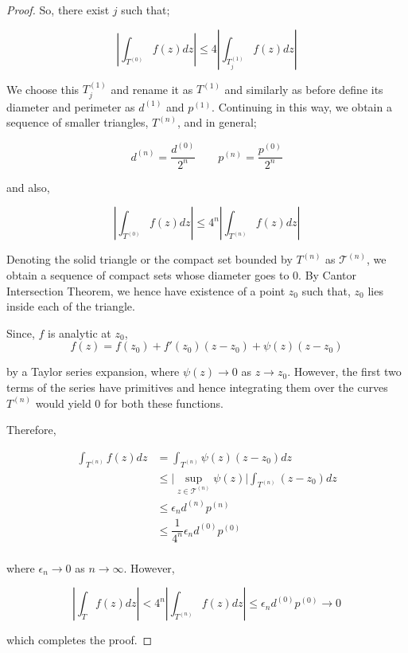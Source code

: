 \documentclass[12pt]{article}
\theoremstyle{definition}
\begin{document}
\begin{proof}
    So, there exist $j$ such that; 

    $$\left\vert  \int_{T^{(0)}} f(z)dz \right\vert \leq 4 \left\vert \int_{T_j^{(1)}} f(z)dz \right\vert $$

    We choose this $T_j^{(1)}$ and rename it as $T^{(1)}$ and similarly as before define its diameter and perimeter as $d^{(1)}$ and $p^{(1)}$. Continuing in this way, we obtain a sequence of smaller triangles, $T^{(n)}$, and in general;

    $$d^{(n)} = \dfrac{d^{(0)}}{2^n} \qquad p^{(n)} = \dfrac{p^{(0)}}{2^n}$$
    
    and also,

    $$\left\vert  \int_{T^{(0)}} f(z)dz \right\vert \leq 4^n \left\vert \int_{T^{(n)}} f(z)dz \right\vert $$

    Denoting the solid triangle or the compact set bounded by $T^{(n)}$ as $\mathcal{T}^{(n)}$, we obtain a sequence of compact sets whose diameter goes to $0$. By Cantor Intersection Theorem, we hence have existence of a point $z_0$ such that, $z_0$ lies inside each of the triangle. 
    
    Since, $f$ is analytic at $z_0$, 
    $$f(z) = f(z_0) + f'(z_0) (z- z_0) + \psi(z) (z - z_0)$$

    by a Taylor series expansion, where $\psi(z) \rightarrow 0$ as $z \rightarrow z_0$. However, the first two terms of the series have primitives and hence integrating them over the curves $T^{(n)}$ would yield $0$ for both these functions.

    Therefore,

    \begin{align*}
        \int_{T^{(n)}} f(z)dz 
        & = \int_{T^{(n)}} \psi(z) (z - z_0) dz\\
        & \leq \vert \sup_{z \in \mathcal{T}^{(n)} }\psi(z) \vert \int_{T^{(n)}} (z - z_0) dz\\
        & \leq \epsilon_n d^{(n)} p^{(n)}\\
        & \leq \dfrac{1}{4^n}\epsilon_n d^{(0)} p^{(0)}\\
    \end{align*}

    where $\epsilon_n \rightarrow 0$ as $n \rightarrow \infty$. However,

    $$\left\vert \int_{T} f(z)dz \right\vert < 4^n \left\vert \int_{T^{(n)}} f(z)dz \right\vert  \leq \epsilon_n d^{(0)} p^{(0)} \rightarrow 0$$

    which completes the proof.
\end{proof}
\end{document}
